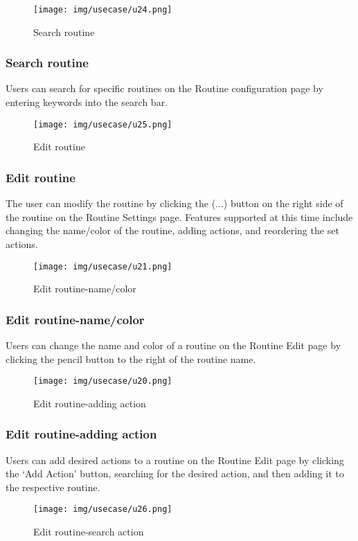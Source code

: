 \documentclass[conference]{IEEEtran}
\begin{document}
\begin{figure}[h!]
\centering
\texttt{[image: img/usecase/u24.png]}
\caption{Search routine}
\end{figure}
\subsubsection{Search routine}
Users can search for specific routines on the Routine configuration page by entering keywords into the search bar.
\vspace{2cm}
\begin{figure}[h!]
\centering
\texttt{[image: img/usecase/u25.png]}
\caption{Edit routine}
\end{figure}
\subsubsection{Edit routine}
The user can modify the routine by clicking the (...) button on the right side of the routine on the Routine Settings page. Features supported at this time include changing the name/color of the routine, adding actions, and reordering the set actions.
\clearpage
\begin{figure}[h!]
\centering
\texttt{[image: img/usecase/u21.png]}
\caption{Edit routine-name/color}
\end{figure}
\subsubsection{Edit routine-name/color}
Users can change the name and color of a routine on the Routine Edit page by clicking the pencil button to the right of the routine name.
\vspace{2cm}
\begin{figure}[h!]
\centering
\texttt{[image: img/usecase/u20.png]}
\caption{Edit routine-adding action}
\end{figure}
\subsubsection{Edit routine-adding action}
Users can add desired actions to a routine on the Routine Edit page by clicking the `Add Action' button, searching for the desired action, and then adding it to the respective routine.
\vspace{1cm}
\begin{figure}[h!]
\centering
\texttt{[image: img/usecase/u26.png]}
\caption{Edit routine-search action}
\end{figure}
\end{document}
